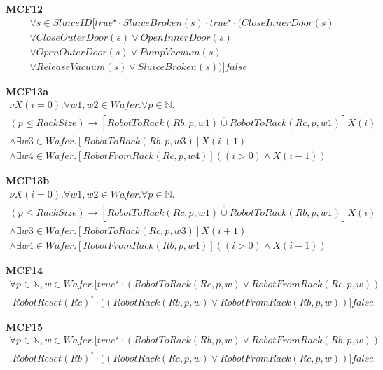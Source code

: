 \documentclass[12pt]{report}
\begin{document}
    \textbf{MCF12}
    \begin{multline*}
        \forall s \in SluiceID [true^{\star} \cdot SluiceBroken(s) \cdot true^{\star} \cdot (CloseInnerDoor(s) \\
        \vee CloseOuterDoor(s) \vee OpenInnerDoor(s) \\
        \vee OpenOuterDoor(s) \vee PumpVacuum(s) \\
        \vee ReleaseVacuum(s) \vee SluiceBroken(s))]false
    \end{multline*}

    \textbf{MCF13a}
    \begin{multline*}
        \nu X(i=0). \forall w1,w2 \in \mathit{Wafer}. \forall p \in \mathbb{N}. \\
        (p \leq RackSize) \rightarrow [\overline{RobotToRack(Rb,p,w1) \cup RobotToRack(Rc,p,w1)}]X(i) \\
        \wedge \exists w3 \in \mathit{Wafer}. [RobotToRack(Rb,p,w3)]X(i+1) \\
        \wedge \exists w4 \in \mathit{Wafer}. [RobotFromRack(Rc,p,w4)]((i>0) \wedge X(i-1))
    \end{multline*}

    \textbf{MCF13b}
    \begin{multline*}
        \nu X(i=0). \forall w1,w2 \in \mathit{Wafer}. \forall p \in \mathbb{N}. \\
        (p \leq RackSize) \rightarrow [\overline{RobotToRack(Rc,p,w1) \cup RobotToRack(Rb,p,w1)}]X(i) \\
        \wedge \exists w3 \in \mathit{Wafer}. [RobotToRack(Rc,p,w3)]X(i+1) \\
        \wedge \exists w4 \in \mathit{Wafer}. [RobotFromRack(Rb,p,w4)]((i>0) \wedge X(i-1))
    \end{multline*}

    \textbf{MCF14}
    \begin{multline*}
        \forall p \in \mathbb{N}, w \in \mathit{Wafer}. [true^{\star} \cdot(RobotToRack(Rc,p,w) \vee RobotFromRack(Rc,p,w))\\
        \cdot \overline{RobotReset(Rc)}^{\star} \cdot ((RobotRack(Rb,p,w) \vee RobotFromRack(Rb,p,w))]false
    \end{multline*}

    \textbf{MCF15}
    \begin{multline*}
        \forall p \in \mathbb{N}, w \in \mathit{Wafer}. [true^{\star} \cdot (RobotToRack(Rb,p,w) \vee RobotFromRack(Rb,p,w))\\
        .\overline{RobotReset(Rb)}^{\star} \cdot ((RobotRack(Rc,p,w) \vee RobotFromRack(Rc,p,w))]false
    \end{multline*}
\end{document}
